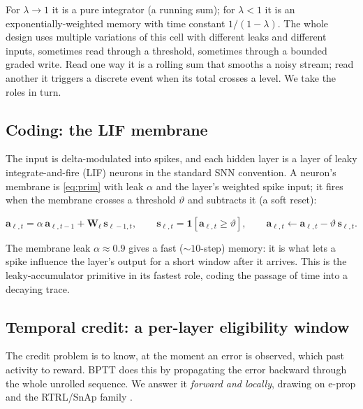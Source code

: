 \documentclass[11pt]{article}
\begin{document}
For \(\lambda \to 1\) it is a pure integrator (a running sum); for
\(\lambda < 1\) it is an exponentially-weighted memory with time
constant \(1/(1-\lambda)\). The whole design uses multiple variations of
this cell with different leaks and different inputs, sometimes read
through a threshold, sometimes through a bounded graded write. Read one
way it is a rolling sum that smooths a noisy stream; read another it
triggers a discrete event when its total crosses a level. We take the
roles in turn.

\hypertarget{sec:coding}{%
\subsection{Coding: the LIF membrane}\label{sec:coding}}

The input is delta-modulated into spikes, and each hidden layer is a
layer of leaky integrate-and-fire (LIF) neurons in the standard SNN
convention. A neuron's membrane is \eqref{eq:prim} with leak \(\alpha\)
and the layer's weighted spike input; it fires when the membrane crosses
a threshold \(\vartheta\) and subtracts it (a soft reset):

\begin{equation}
\bm a_{\ell,t} = \alpha\, \bm a_{\ell,t-1} + \bm W_\ell\, \bm s_{\ell-1,t}, \qquad
\bm s_{\ell,t} = \mathbf{1}\!\left[\bm a_{\ell,t} \ge \vartheta\right], \qquad
\bm a_{\ell,t} \leftarrow \bm a_{\ell,t} - \vartheta\, \bm s_{\ell,t}.
\label{eq:lif}
\end{equation}

The membrane leak \(\alpha \approx 0.9\) gives a fast
(\({\sim}10\)-step) memory: it is what lets a spike influence the
layer's output for a short window after it arrives. This is the
leaky-accumulator primitive in its fastest role, coding the passage of
time into a decaying trace.

\hypertarget{sec:credit}{%
\subsection{Temporal credit: a per-layer eligibility
window}\label{sec:credit}}

The credit problem is to know, at the moment an error is observed, which
past activity to reward. BPTT does this by propagating the error
backward through the whole unrolled sequence. We answer it \emph{forward
and locally}, drawing on e-prop \cite{bellec2020eprop} and the
RTRL/SnAp family
\cite{williams1989learning, menick2021snap, marschall2020unified}.
\end{document}

